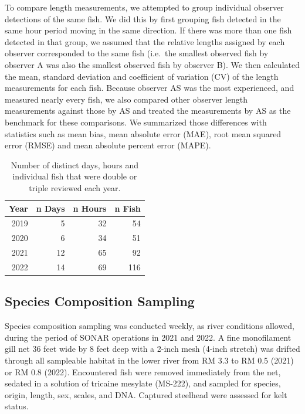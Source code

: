 \documentclass[
]{article}
\begin{document}
To compare length measurements, we attempted to group individual observer detections of the same fish. We did this by first grouping fish detected in the same hour period moving in the same direction. If there was more than one fish detected in that group, we assumed that the relative lengths assigned by each observer corresponded to the same fish (i.e.~the smallest observed fish by observer A was also the smallest observed fish by observer B). We then calculated the mean, standard deviation and coefficient of variation (CV) of the length measurements for each fish. Because observer AS was the most experienced, and measured nearly every fish, we also compared other observer length measurements against those by AS and treated the measurements by AS as the benchmark for these comparisons. We summarized those differences with statistics such as mean bias, mean absolute error (MAE), root mean squared error (RMSE) and mean absolute percent error (MAPE).

\begin{table}[!h]

\caption{\label{tab:obs-rev-tab}Number of distinct days, hours and individual fish that were double or triple reviewed each year.}
\centering
\begin{tabular}[t]{rrrr}
\toprule
Year & n Days & n Hours & n Fish\\
\midrule
2019 & 5 & 32 & 54\\
2020 & 6 & 34 & 51\\
2021 & 12 & 65 & 92\\
2022 & 14 & 69 & 116\\
\bottomrule
\end{tabular}
\end{table}

\FloatBarrier

\hypertarget{species-composition-sampling}{%
\subsection{Species Composition Sampling}\label{species-composition-sampling}}

Species composition sampling was conducted weekly, as river conditions allowed, during the period of SONAR operations in 2021 and 2022. A fine monofilament gill net 36 feet wide by 8 feet deep with a 2-inch mesh (4-inch stretch) was drifted through all sampleable habitat in the lower river from RM 3.3 to RM 0.5 (2021) or RM 0.8 (2022). Encountered fish were removed immediately from the net, sedated in a solution of tricaine mesylate (MS-222), and sampled for species, origin, length, sex, scales, and DNA. Captured steelhead were assessed for kelt status.
\end{document}
